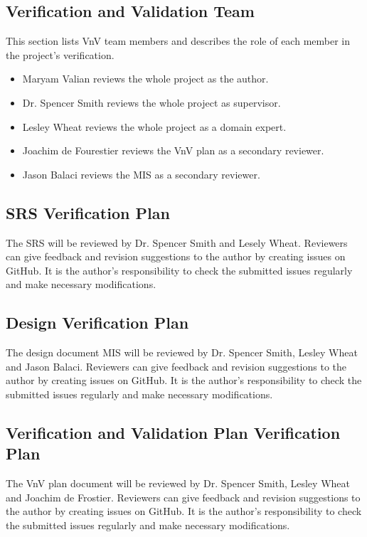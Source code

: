 \documentclass[12pt, titlepage]{article}
\begin{document}
\subsection{Verification and Validation Team} \label{VTeam}
This section lists VnV team members and describes the role of each member in the project's verification.
\begin{itemize}
\item {Maryam Valian reviews the whole project as the author.}
\item {Dr. Spencer Smith reviews the whole project as supervisor.}
\item{Lesley Wheat reviews the whole project as a domain expert.}
\item{Joachim de Fourestier reviews the VnV plan as a secondary reviewer.}
\item{Jason Balaci reviews the MIS as a secondary reviewer.}

\end{itemize}

\subsection{SRS Verification Plan} \label{SRSvplan}
The SRS will be reviewed by Dr. Spencer Smith and Lesely Wheat. Reviewers can give feedback and revision suggestions to the author by creating issues on GitHub. It is the author's responsibility to check the submitted issues regularly and make necessary modifications.

\subsection{Design Verification Plan} \label{Sec_Design_verific}

The design document MIS will be reviewed by Dr. Spencer Smith, Lesley Wheat and Jason Balaci. Reviewers can give feedback and revision suggestions to the author by creating issues on GitHub. It is the author's responsibility to check the submitted issues regularly and make necessary modifications.

\subsection{Verification and Validation Plan Verification Plan} \label{Sec_VofVnV}
The VnV plan document will be reviewed by Dr. Spencer Smith, Lesley Wheat and Joachim de Frostier. Reviewers can give feedback and revision suggestions to the author by creating issues on GitHub. It is the author's responsibility to check the submitted issues regularly and make necessary modifications.
\end{document}
